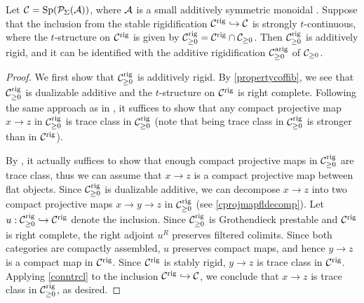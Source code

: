 \documentclass[a4paper,10pt, oneside]{amsart}
\begin{document}
	\begin{thm}\label{addrig}
		Let $\mathcal{C}=\mathrm{Sp}(\mathcal{P}_{\Sigma}(\mathcal{A}))$, where $\mathcal{A}$ is a small additively symmetric monoidal \infcat. Suppose that the inclusion from the stable rigidification %
		$\mathcal{C}^\mathrm{rig}\hookrightarrow \mathcal{C}$ is strongly $t$-continuous, where the $t$-structure on $\mathcal{C}^\mathrm{rig}$ is given by $\mathcal{C}^\mathrm{rig}_{\geq 0}=\mathcal{C}^\mathrm{rig}\cap \mathcal{C}_{\geq0}$. Then  $\mathcal{C}^\mathrm{rig}_{\geq 0}$ is additively rigid, and it can be identified with the additive rigidification $\mathcal{C}_{\geq0}^\mathrm{arig}$ of $\mathcal{C}_{\geq0}$. 
	\end{thm}
	\begin{proof}
		We first show that  $\mathcal{C}^\mathrm{rig}_{\geq 0}$ is additively rigid. 
		By \cref{propertycoffib}, we see that $\mathcal{C}^\mathrm{rig}_{\geq 0}$ is dualizable 
		additive and the $t$-structure on $\mathcal{C}^{\mathrm{rig}}$ is right complete. Following 
		the same approach as in \cite[Proposition 4.15]{ramzi2024locally}, it suffices 
		to show that any compact projective map $x\to z$ in $\mathcal{C}^\mathrm{rig}_{\geq 0}$ is 
		trace class in $\mathcal{C}^{\mathrm{rig}}_{\geq 0}$ (note that being trace class in $\mathcal{C}^{\mathrm{rig}}_{\geq 0}$ is stronger than in $\mathcal{C}^{\mathrm{rig}}$). 
		
		By \cite[Addendum 2.42]{ramzi2024dualizable}, it actually suffices to show that enough compact projective maps in $\mathcal{C}^\mathrm{rig}_{\geq 0}$ are trace class, thus we can assume that $x\to z$ is a compact projective map between flat objects.
		Since $\mathcal{C}^\mathrm{rig}_{\geq 0}$ is dualizable additive, we can decompose $x\to z$ into two compact projective maps $x\to y \to z$ in $\mathcal{C}^\mathrm{rig}_{\geq 0}$ (see  \cref{cprojmapfldecomp}).  Let $u:\mathcal{C}^\mathrm{rig}_{\geq 0}\hookrightarrow\mathcal{C}^\mathrm{rig}$ denote the inclusion. Since $\mathcal{C}^\mathrm{rig}_{\geq 0}$ is Grothendieck prestable and $\mathcal{C}^\mathrm{rig}$ is right complete, the right adjoint $u^R$ preserves filtered colimits. Since both categories are compactly assembled, $u$ preserves compact maps, and hence $y\to z$ is a compact map in $\mathcal{C}^\mathrm{rig}$. Since $\mathcal{C}^\mathrm{rig}$ is stably rigid, $y\to z$ is trace class in $\mathcal{C}^\mathrm{rig}$. Applying \cref{conntrcl} to the inclusion $\mathcal{C}^\mathrm{rig}\hookrightarrow\mathcal{C}$, we conclude that $x\to z$ is trace class in $\mathcal{C}^\mathrm{rig}_{\geq 0}$, as desired.
		

\end{proof}
\end{document}
